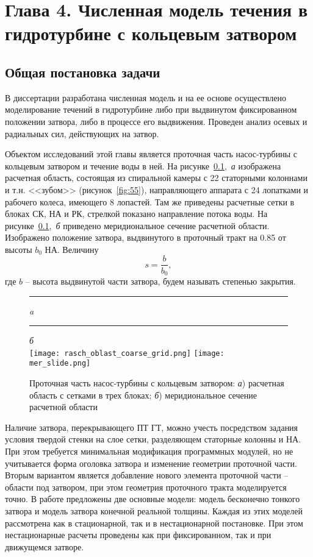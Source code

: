 \chapter*{Глава 4. Численная модель течения в гидротурбине с кольцевым затвором}
\label{s:4}
\setcounter{chapter}{4}
\setcounter{section}{0}

\section{Общая постановка задачи}
\label{s:41}
В диссертации разработана численная модель и на ее основе осуществлено моделирование течений в гидротурбине 
либо при выдвинутом фиксированном положении затвора, либо в процессе его выдвижения. Проведен анализ 
осевых и радиальных сил, действующих на затвор.

Объектом исследований этой главы является проточная часть насос-турбины с кольцевым затвором и течение воды в 
ней. На рисунке~\ref{fig:1},~\emph{а} изображена расчетная область, состоящая из спиральной камеры с 22 
статорными колоннами и т.н. <<зубом>> (рисунок~\ref{fig:55}), направляющего аппарата с 24 лопатками и 
рабочего колеса, имеющего 8 лопастей. Там же приведены расчетные сетки в блоках СК, НА и РК, стрелкой 
показано направление потока воды. На рисунке~\ref{fig:1},~\emph{б} приведено меридиональное сечение расчетной 
области. Изображено положение затвора, выдвинутого в проточный тракт на 0.85 от высоты $b_0$ НА. 
Величину 
\begin{equation}
  s=\dfrac{b}{b_0},
\end{equation}
где $b$ -- высота выдвинутой части затвора, будем называть степенью закрытия.   
\begin{figure}[ht]
  \centering \small \rule{20mm}{0mm}\emph{a}\rule{90mm}{0mm}\emph{б}\\[1.5mm]
  {\texttt{[image: rasch\_oblast\_coarse\_grid.png]}}\hfill
  {\texttt{[image: mer\_slide.png]}}\\  
  \caption{Проточная часть насос-турбины с кольцевым затвором: \emph{а}) расчетная область с сетками 
           в трех блоках; \emph{б}) меридиональное сечение расчетной области}
  \label{fig:1}
\end{figure}

Наличие затвора, перекрывающего ПТ ГТ, можно учесть посредством задания условия твердой стенки на слое сетки, 
разделяющем статорные колонны и НА. При этом требуется минимальная модификация программных модулей, но не 
учитывается форма оголовка затвора и изменение геометрии проточной части. Вторым вариантом является добавление
нового элемента проточной части -- области под затвором, при этом геометрия проточного тракта моделируется 
точно. В работе предложены две основные модели: модель бесконечно тонкого затвора и 
модель затвора конечной реальной толщины. Каждая из этих моделей рассмотрена как в стационарной, так и в 
нестационарной постановке. При этом нестационарные расчеты проведены как при фиксированном, так и при 
движущемся затворе. 

